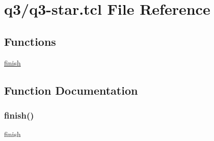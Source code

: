 \hypertarget{q3-star_8tcl}{}\section{q3/q3-\/star.tcl File Reference}
\label{q3-star_8tcl}
\subsection*{Functions}
\begin{DoxyCompactItemize}
\item 
\hyperlink{q3-star_8tcl_a30728837c246b65ef76298af0101d99c}{finish}
\end{DoxyCompactItemize}


\subsection{Function Documentation}
\mbox{\label{q3-star_8tcl_a30728837c246b65ef76298af0101d99c}} 
\subsubsection{\texorpdfstring{finish()}{finish()}}
{\footnotesize\ttfamily finish}

